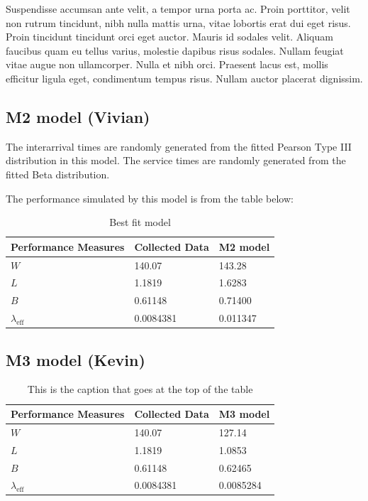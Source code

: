 \documentclass{article}
\begin{document}
Suspendisse accumsan ante velit, a tempor urna porta ac. Proin porttitor, velit non rutrum tincidunt, nibh nulla mattis urna, vitae lobortis erat dui eget risus. Proin tincidunt tincidunt orci eget auctor. Mauris id sodales velit. Aliquam faucibus quam eu tellus varius, molestie dapibus risus sodales. Nullam feugiat vitae augue non ullamcorper. Nulla et nibh orci. Praesent lacus est, mollis efficitur ligula eget, condimentum tempus risus. Nullam auctor placerat dignissim.

\subsection{M2 model (Vivian)}

The interarrival times are randomly generated from the fitted Pearson Type III distribution in this model. The service times are randomly generated from the fitted Beta distribution.

The performance simulated by this model is from the table below:

\begin{table}[H]
    \centering
    \caption{Best fit model}
    \begin{tabu}{*{3}{X[c]}}
        \toprule
        \textbf{Performance Measures} & \textbf{Collected Data} & \textbf{M2 model}\\
        \midrule
        $W$ & 140.07 & 143.28\\
        $L$ & 1.1819 & 1.6283\\
        $B$ & 0.61148 & 0.71400\\
        $\lambda_{\text{eff}}$ & 0.0084381 & 0.011347\\
        \bottomrule
    \end{tabu}
    \label{tab:M2}
\end{table}



\subsection{M3 model (Kevin)}

\begin{table}[h!]
    \centering
    \caption{This is the caption that goes at the top of the table}
    \begin{tabu}{*{3}{X[c]}}
        \toprule
        \textbf{Performance Measures} & \textbf{Collected Data} & \textbf{M3 model}\\
        \midrule
        $W$ & 140.07 & 127.14\\
        $L$ & 1.1819 & 1.0853\\
        $B$ & 0.61148 & 0.62465\\
        $\lambda_{\text{eff}}$ & 0.0084381 & 0.0085284\\
        \bottomrule
    \end{tabu}
    \label{tab:M3}
\end{table}
\end{document}
